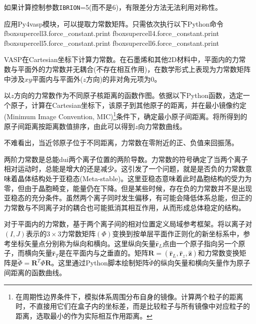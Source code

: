 


如果计算控制参数\texttt{IBRION}=5(而不是6)，有限差分方法无法利用对称性。

应用\textrm{Py4vasp}模块，可以提取力常数矩阵。只需依次执行以下\textrm{Python}命令
fbox{supercell3.force\_constant.print}
fbox{supercell4.force\_constant.print}
fbox{supercell5.force\_constant.print}
fbox{supercell6.force\_constant.print}

\textrm{VASP}在\textrm{Cartesian}坐标下计算力常数。在石墨烯和其他\textrm{2D}材料中，平面内的力常数与平面外的力常数并无耦合(不存在相互作用)，在数学形式上表现为力常数矩阵中涉及$xy$平面内与平面外($z$方向)的非对角元项为0。

以$z$方向的力常数作为不同原子核距离的函数作图。依据以下\textrm{Python}函数，选定一个原子，计算在\textrm{Cartesian}坐标下，该原子到其他原子的距离，并在最小镜像约定\textrm{(Minimum Image Convention, MIC)}\footnote{在周期性边界条件下，模拟体系周围分布自身的镜像。计算两个粒子的距离时，不直接用它们在盒子内的坐标差，而是比较粒子与所有镜像中对应粒子的距离，选取最小的作为实际相互作用距离。}条件下，确定最小原子间距离。将所得到的原子间距离按距离数值排序，由此可以得到$z$向力常数曲线。

不难看出，当近邻原子位于不同距离，力常数在零附近的正、负值来回振荡。

两阶力常数是总能dui两个离子位置的两阶导数。力常数的符号确定了当两个离子相对运动时，总能是增大的还是减少。这引发了一个问题，就是是否负的力常数意味着晶体结构处于亚稳态\textrm{(Meta-stable)}。这里亚稳态意味着此时晶胞结构的受力为零，但由于晶胞畸变，能量仍在下降。但是某些时候，存在负的力常数并不是出现亚稳态的充分条件。虽然两个离子同时发生偏移，有可能会降低体系总能，但正的力常数与不同离子对的耦合也可能抵消其相互作用，从而形成总体稳定的结构。

对于平面内的力常数，基于两个离子间的相对位置定义局域参考框架。将以离子对$(I,J)$表示的$3\times3$力常数矩阵$(\Phi)$变换到按单层平面作正则化的新坐标系中，参考坐标矢量点分别称为纵向和横向。这里纵向矢量$\hat{\mathbf{r}}_L$点由一个原子指向另一个原子，而横向矢量$\hat{\mathbf{r}}_T$是在平面内与之垂直的。矩阵$\mathbf{R}=(\hat{\mathbf{r}}_L,\hat{\mathbf{r}}_z,\hat{\mathbf{z}})$和力常数变换矩阵是$\tilde{\Phi}=\mathbf{R}^T\Phi\mathbf{R}$。这里通过\textrm{Python}脚本绘制矩阵$\tilde{\Phi}$的纵向矢量和横向矢量作为原子间距离的函数曲线。

